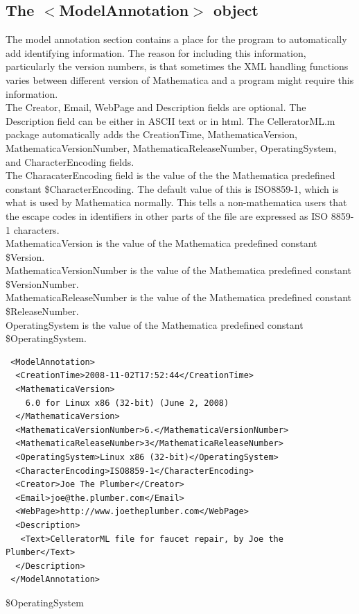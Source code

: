 \documentclass[12pt,letterpaper]{article}
\begin{document}
\subsection{The $<$ModelAnnotation$>$ object}\label{section:Ann}

The model annotation section contains a place for the program to automatically add identifying information. The reason for including this information, particularly the version numbers, is that sometimes the XML handling functions varies between different version of Mathematica and a program might require this information. \\

The Creator, Email, WebPage and Description fields are optional. The Description field can be either in ASCII text or in html. The CelleratorML.m package automatically adds the CreationTime, MathematicaVersion, MathematicaVersionNumber, MathematicaReleaseNumber, OperatingSystem, and CharacterEncoding fields.\\

The CharacaterEncoding field is the value of the  the Mathematica predefined constant \$CharacterEncoding. The default value of this is ISO8859-1, which is what is used by Mathematica normally. This tells a non-mathematica users that the escape codes in identifiers in other parts of the file are expressed as ISO 8859-1 characters.\\

MathematicaVersion is the value of the Mathematica predefined constant \$Version.\\

MathematicaVersionNumber is the value of the Mathematica predefined constant \$VersionNumber.\\

MathematicaReleaseNumber is the value of the Mathematica predefined constant \$ReleaseNumber.\\

OperatingSystem is the value of the Mathematica predefined constant \$OperatingSystem.\\

\begin{verbatim}
 <ModelAnnotation>
  <CreationTime>2008-11-02T17:52:44</CreationTime>
  <MathematicaVersion>
    6.0 for Linux x86 (32-bit) (June 2, 2008)
  </MathematicaVersion>
  <MathematicaVersionNumber>6.</MathematicaVersionNumber>
  <MathematicaReleaseNumber>3</MathematicaReleaseNumber>
  <OperatingSystem>Linux x86 (32-bit)</OperatingSystem>
  <CharacterEncoding>ISO8859-1</CharacterEncoding>
  <Creator>Joe The Plumber</Creator>
  <Email>joe@the.plumber.com</Email>
  <WebPage>http://www.joetheplumber.com</WebPage>
  <Description>
   <Text>CelleratorML file for faucet repair, by Joe the Plumber</Text>
  </Description>
 </ModelAnnotation>
\end{verbatim}
\$OperatingSystem
\end{document}
